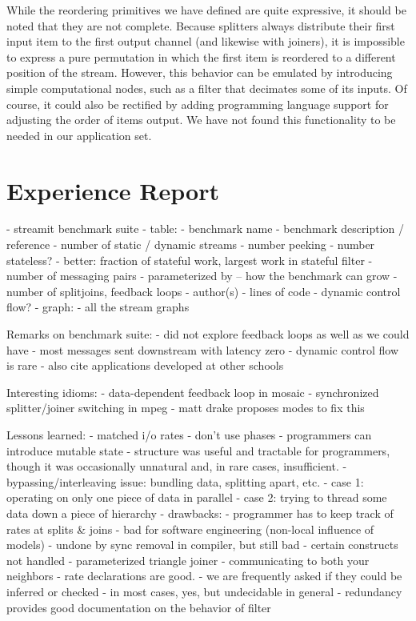 While the reordering primitives we have defined are quite expressive,
it should be noted that they are not complete.  Because splitters
always distribute their first input item to the first output channel
(and likewise with joiners), it is impossible to express a pure
permutation in which the first item is reordered to a different
position of the stream.  However, this behavior can be emulated by
introducing simple computational nodes, such as a filter that
decimates some of its inputs.  Of course, it could also be rectified
by adding programming language support for adjusting the order of
items output.  We have not found this functionality to be needed in
our application set.


\section{Experience Report}
\label{sec:lang-experience}

- streamit benchmark suite
  - table:
    - benchmark name
    - benchmark description / reference
    - number of static / dynamic streams
    - number peeking
    - number stateless?
      - better: fraction of stateful work, largest work in stateful filter
    - number of messaging pairs
    - parameterized by -- how the benchmark can grow
    - number of splitjoins, feedback loops
    - author(s)
    - lines of code
    - dynamic control flow?
  - graph:
    - all the stream graphs

Remarks on benchmark suite:
 - did not explore feedback loops as well as we could have
 - most messages sent downstream with latency zero
 - dynamic control flow is rare
 - also cite applications developed at other schools

Interesting idioms:
- data-dependent feedback loop in mosaic
- synchronized splitter/joiner switching in mpeg
  - matt drake proposes modes to fix this

Lessons learned:
  - matched i/o rates
  - don't use phases
  - programmers can introduce mutable state
  - structure was useful and tractable for programmers, though it was
    occasionally unnatural and, in rare cases, insufficient.
    - bypassing/interleaving issue: bundling data, splitting apart, etc.
      - case 1: operating on only one piece of data in parallel
      - case 2: trying to thread some data down a piece of hierarchy
      - drawbacks:
        - programmer has to keep track of rates at splits \& joins
        - bad for software engineering (non-local influence of models)
      - undone by sync removal in compiler, but still bad
    - certain constructs not handled
      - parameterized triangle joiner
      - communicating to both your neighbors
  - rate declarations are good.
    - we are frequently asked if they could be inferred or checked
    - in most cases, yes, but undecidable in general
    - redundancy provides good documentation on the behavior of filter

